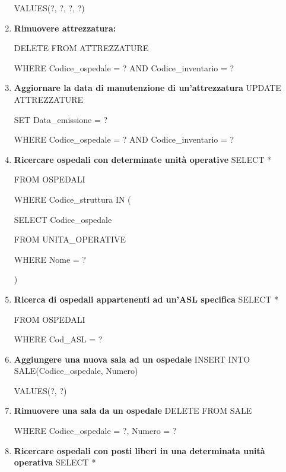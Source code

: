 \documentclass[a4paper,12pt]{report}
\begin{document}
\begin{enumerate}[leftmargin=0cm,itemindent=.5cm,labelwidth=\itemindent,labelsep=0cm,align=left]
    VALUES(?, ?, ?, ?)

    \item \textbf{Rimuovere attrezzatura:} \newline
    
    DELETE FROM ATTREZZATURE

    WHERE Codice\_ospedale = ? AND Codice\_inventario = ?

    \item \textbf{Aggiornare la data di manutenzione di un'attrezzatura} \newline
    UPDATE ATTREZZATURE
    
    SET Data\_emissione = ?
    
    WHERE Codice\_ospedale = ? AND Codice\_inventario = ?

    \item \textbf{Ricercare ospedali con determinate unità operative} \newline
    SELECT *

    FROM OSPEDALI
    
    WHERE Codice\_struttura IN (
    
        SELECT Codice\_ospedale
    
        FROM UNITA\_OPERATIVE
    
        WHERE Nome = ?

    )

    \item \textbf{Ricerca di ospedali appartenenti ad un'ASL specifica} \newline
    SELECT *
    
    FROM OSPEDALI
    
    WHERE Cod\_ASL = ?

    \item \textbf{Aggiungere una nuova sala ad un ospedale} \newline
    INSERT INTO SALE(Codice\_ospedale, Numero)
    
    VALUES(?, ?)

    \item \textbf{Rimuovere una sala da un ospedale} \newline
    DELETE FROM SALE
    
    WHERE Codice\_ospedale = ?, Numero = ?

    \item \textbf{Ricercare ospedali con posti liberi in una determinata unità operativa} \newline
    SELECT *
    

\end{enumerate}
\end{document}

